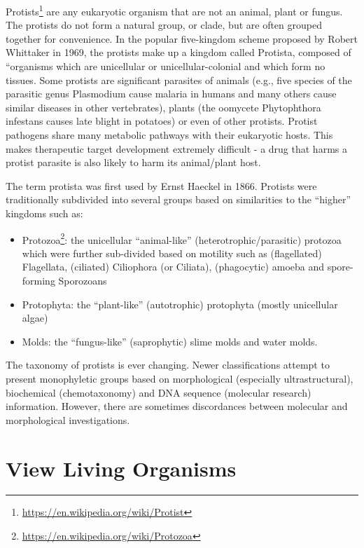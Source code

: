 \documentclass[]{book}
\providecommand{\tightlist}{%
  \setlength{\itemsep}{0pt}\setlength{\parskip}{0pt}}
\let\rmarkdownfootnote\footnote%
\def\footnote{\protect\rmarkdownfootnote}
\renewcommand{\href}[2]{#2\footnote{\url{#1}}}
\theoremstyle{definition}
\theoremstyle{definition}
\theoremstyle{definition}
\theoremstyle{remark}
\begin{document}
\href{https://en.wikipedia.org/wiki/Protist}{Protists} are any
eukaryotic organism that are not an animal, plant or fungus. The
protists do not form a natural group, or clade, but are often grouped
together for convenience. In the popular five-kingdom scheme proposed by
Robert Whittaker in 1969, the protists make up a kingdom called
Protista, composed of ``organisms which are unicellular or
unicellular-colonial and which form no tissues. Some protists are
significant parasites of animals (e.g., five species of the parasitic
genus Plasmodium cause malaria in humans and many others cause similar
diseases in other vertebrates), plants (the oomycete Phytophthora
infestans causes late blight in potatoes) or even of other protists.
Protist pathogens share many metabolic pathways with their eukaryotic
hosts. This makes therapeutic target development extremely difficult - a
drug that harms a protist parasite is also likely to harm its
animal/plant host.

The term protista was first used by Ernst Haeckel in 1866. Protists were
traditionally subdivided into several groups based on similarities to
the ``higher'' kingdoms such as:

\begin{itemize}
\tightlist
\item
  \href{https://en.wikipedia.org/wiki/Protozoa}{Protozoa}: the
  unicellular ``animal-like'' (heterotrophic/parasitic) protozoa which
  were further sub-divided based on motility such as (flagellated)
  Flagellata, (ciliated) Ciliophora (or Ciliata), (phagocytic) amoeba
  and spore-forming Sporozoans
\item
  Protophyta: the ``plant-like'' (autotrophic) protophyta (mostly
  unicellular algae)
\item
  Molds: the ``fungus-like'' (saprophytic) slime molds and water molds.
\end{itemize}

The taxonomy of protists is ever changing. Newer classifications attempt
to present monophyletic groups based on morphological (especially
ultrastructural), biochemical (chemotaxonomy) and DNA sequence
(molecular research) information. However, there are sometimes
discordances between molecular and morphological investigations.

\section{View Living Organisms}\label{view-living-organisms-1}
\end{document}
